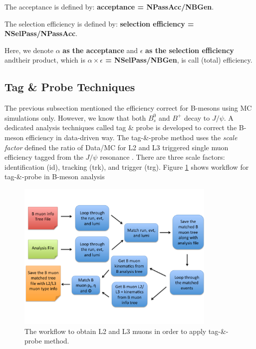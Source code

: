 The acceptance is defined by: \textbf{acceptance = NPassAcc/NBGen}.

The selection efficiency is defined by: \textbf{selection efficiency = NSelPass/NPassAcc}.

Here, we denote $\alpha$ \textbf{as the acceptance} and $\epsilon$ \textbf{as the selection efficiency} andtheir product, which is \textbf{$\alpha \times \epsilon$ = NSelPass/NBGen}, is call (total) efficiency. 

\subsection{Tag \& Probe Techniques}

The previous subsection mentioned the efficiency correct for B-mesons using MC simulations only. However, we know that both $B^0_s$ and $B^+$ decay to $J/\psi$. A dedicated analysis techniques called tag \& probe is developed to correct the B-meson efficiency in data-driven way. The tag-\&-probe method uses the \textit{scale factor} defined the ratio of Data/MC for L2 and L3 triggered single muon efficiency tagged from the $J/\psi$ resonance \cite{TnPMethod}. There are three scale factors: identification (id), tracking (trk), and trigger (trg). Figure \ref{L2L3MuonWF} shows workflow for tag-\&-probe in B-meson analysis


\begin{figure}[h]
\begin{center}
\includegraphics[width= 0.85\textwidth]{Figures/Chapter5/L2L3MuonWF.pdf}
\caption{The workflow to obtain L2 and L3 muons in order to apply tag-\&-probe method.}
\label{L2L3MuonWF}
\end{center}
\end{figure}

